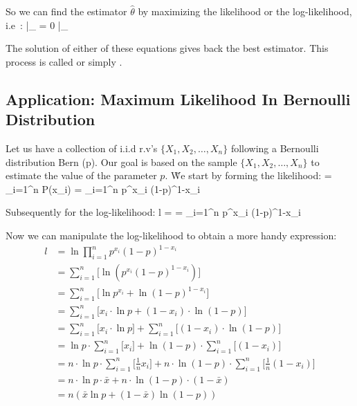 So we can find the estimator $\hat{\theta}$ by maximizing the likelihood or the log-likelihood, i.e\ :
\bse
{} \Big|_{} = 0 \qquad {} \qquad
{} \Big|_{}
\ese

The solution of either of these equations gives back the best estimator. This process is called  or simply .

\subsection{Application: Maximum Likelihood In Bernoulli Distribution}

Let us have a collection of i.i.d r.v's $\{ X_{1}, X_{2}, \ldots, X_{n} \}$ following a Bernoulli distribution Bern
(p). Our goal is based on the sample $\{ X_{1}, X_{2}, \ldots, X_{n} \}$ to estimate the value of the parameter $p$. \v

We start by forming the likelihood:
\bse
{} = \prod_{i=1}^{n} P(x_{i}) = \prod_{i=1}^{n} p^{x_{i}} (1-p)^{1-x_{i}}
\ese

Subsequently for the log-likelihood:
\bse
l = \ln {} = \ln \prod_{i=1}^{n} p^{x_{i}} (1-p)^{1-x_{i}}
\ese

Now we can manipulate the log-likelihood to obtain a more handy expression:
\begingroup
\allowdisplaybreaks
{\setlength{\jot}{10pt}
\begin{align*}
l &= \ln \prod_{i=1}^{n} p^{x_{i}} (1-p)^{1-x_{i}} \\
&= \sum_{i=1}^{n} \Big[ \ln ( p^{x_{i}} (1-p)^{1-x_{i}}) \Big] \\
&= \sum_{i=1}^{n} \Big[ \ln p^{x_{i}} + \ln (1-p)^{1-x_{i}} \Big] \\
&= \sum_{i=1}^{n} \Big[ x_{i} \cdot \ln p + (1-x_{i}) \cdot \ln(1-p) \Big] \\
&= \sum_{i=1}^{n} \Big[ x_{i} \cdot \ln p \Big] + \sum_{i=1}^{n} \Big[ (1-x_{i}) \cdot \ln (1-p) \Big] \\
&= \ln p \cdot \sum_{i=1}^{n} \Big[ x_{i} \Big] + \ln (1-p) \cdot \sum_{i=1}^{n} \Big[ (1-x_{i}) \Big] \\
&= n \cdot \ln p \cdot \sum_{i=1}^{n} \Big[ \frac{1}{n} x_{i} \Big] +
n \cdot \ln (1-p) \cdot \sum_{i=1}^{n} \Big[ \frac{1}{n} (1-x_{i}) \Big] \\
&= n \cdot \ln p \cdot \bar{x} + n \cdot \ln (1-p) \cdot (1 - \bar{x}) \\
&= n (\bar{x} \ln p +(1 - \bar{x}) \ln (1-p))
\end{align*}}
\endgroup


